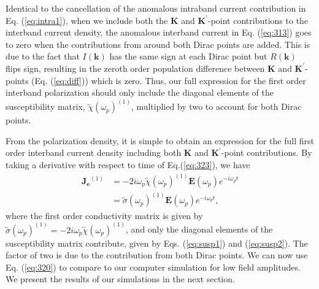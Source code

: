 \documentclass[twocolumn,secnumarabic,amssymb, nobibnotes, aps, prd, superscriptaddress]{revtex4-1}
\begin{document}
Identical to the cancellation of the anomalous intraband current contribution in Eq. (\ref{eq:intra1}), when we include both the  $\mathbf{K}$ and $\mathbf{K}^{\prime}$-point contributions to the interband current density, the anomalous interband current in Eq. (\ref{eq:313}) goes to zero when the contributions from around both Dirac points are added. This is due to the fact that $I(\mathbf{k})$ has the same sign at each Dirac point but $R(\mathbf{k})$ flips sign, resulting in the zeroth order population difference between $\mathbf{K}$ and $\mathbf{K}^{\prime}$-points (Eq. (\ref{eq:diff})) which is zero. Thus, our full expression for the first order interband polarization should only include the diagonal elements of the susceptibility matrix, $\overleftrightarrow{\chi}(\omega_{p})^{(1)}$, multiplied by two to account for both Dirac points.

From the polarization density, it is simple to obtain an expression for the full first order interband current density including both  $\mathbf{K}$ and $\mathbf{K}^{\prime}$-point contributions. By taking a derivative with respect to time of Eq.(\ref{eq:323}), we have
\begin{equation}
\begin{aligned}\mathbf{J_{e}}^{(1)} & =-2i\omega_{p}\overleftrightarrow{\chi}(\omega_{p})^{(1)}\mathbf{E}\left(\omega_{p}\right)e^{-i\omega_{p}t}\\
 & =\overleftrightarrow{\sigma}(\omega_{p})^{(1)}\mathbf{E}\left(\omega_{p}\right)e^{-i\omega_{p}t},
\end{aligned}\label{eq:320}
\end{equation}
where the first order conductivity matrix is given by $\overleftrightarrow{\sigma}(\omega_{p})^{(1)}=-2i\omega_{p}\overleftrightarrow{\chi}(\omega_{p})^{(1)}$,
and only the diagonal elements of the susceptibility matrix contribute, given by Eqs. (\ref{eq:susp1}) and (\ref{eq:susp2}). The factor of two is due to the contribution from both Dirac points. We can now use Eq. (\ref{eq:320}) to compare to our computer simulation for low field amplitudes. We present the results of our simulations in the next section.
\end{document}
